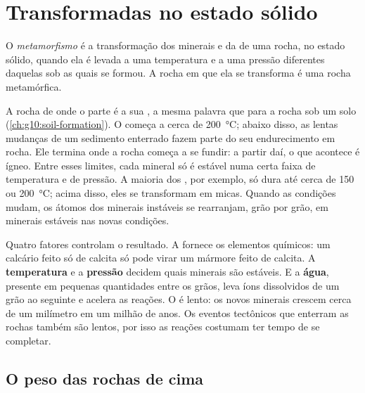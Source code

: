 \section{Transformadas no estado sólido}

\begin{definition}[Metamorfismo]\label{def:g12:metamorphic-rocks:metamorphism}
O \emph{metamorfismo} é a transformação dos minerais e da
 de uma rocha, no estado sólido, quando ela é levada a uma
temperatura e a uma pressão diferentes daquelas sob as quais se formou. A
rocha em que ela se transforma é uma rocha metamórfica.
\end{definition}

A rocha de onde o  parte é a sua , a mesma palavra que
para a rocha sob um solo (\cref{ch:g10:soil-formation}). O 
começa a cerca de \qty{200}{\celsius}; abaixo disso, as lentas mudanças de
um sedimento enterrado fazem parte do seu endurecimento em rocha. Ele
termina onde a rocha começa a se fundir: a partir daí, o que acontece é
ígneo. Entre esses limites, cada mineral só é estável numa certa faixa de
temperatura e de pressão. A maioria dos , por exemplo, só
dura até cerca de 150 ou \qty{200}{\celsius}; acima disso, eles se
transformam em micas. Quando as condições mudam, os átomos dos minerais
instáveis se rearranjam, grão por grão, em minerais estáveis nas novas
condições.

Quatro fatores controlam o resultado. A \textbf{} fornece os
elementos químicos: um calcário feito só de calcita só pode virar um
mármore feito de calcita. A \textbf{temperatura} e a \textbf{pressão} decidem quais
minerais são estáveis. E a \textbf{água}, presente em pequenas quantidades
entre os grãos, leva íons dissolvidos de um grão ao seguinte e acelera as
reações. O  é lento: os novos minerais crescem cerca de um
milímetro em um milhão de anos. Os eventos tectônicos que enterram as
rochas também são lentos, por isso as reações costumam ter tempo de se
completar.

\subsection{O peso das rochas de cima}


